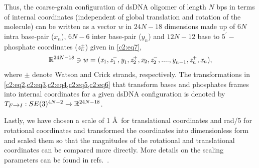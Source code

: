Thus, the coarse-grain  configuration of dsDNA oligomer of length $N$ bps in terms of internal coordinates (independent of global translation and rotation of the molecule) can be written as a vector $w$ in $24N-18$ dimensions made up of $6N$ intra base-pair ($\textit{x}_n$), $6N-6$ inter base-pair ($\textit{y}_n$) and $12N-12$ base to $5^\prime-$phosphate coordinates ($\textit{z}_n^{\pm}$) given in \cref{c2:eq7},
\begin{equation}
{\mathbb R}^{24N-18} \ni w = (\textit{x}_1,\textit{z}_1^{-},\textit{y}_1,\textit{z}_2^{+}, \textit{x}_2,\textit{z}_2^{-},....,\textit{y}_{n-1},\textit{z}_n^{+}, \textit{x}_n),
\label{c2:eq7}
\end{equation}
where $\pm$ denote Watson and Crick strands, respectively. 
The transformations in \cref{c2:eq2,c2:eq3,c2:eq4,c2:eq5,c2:eq6} that transform bases and phosphates frames into internal coordinates for a given dsDNA configuration is denoted by $T_{F\xrightarrow{}I} : SE(3)^{4N-2} \xrightarrow{} {\mathbb R}^{24N-18}$.

Lastly, we have chosen a scale of 1 \AA \ for translational coordinates and rad/5 for rotational coordinates and transformed the coordinates into dimensionless form and scaled them so that the magnitudes of the rotational and translational coordinates can be compared more directly. 
More details on the scaling parameters can be found in refs.~\cite{petthesis,cgDNA1,petkevivciute2014cgdna}.

